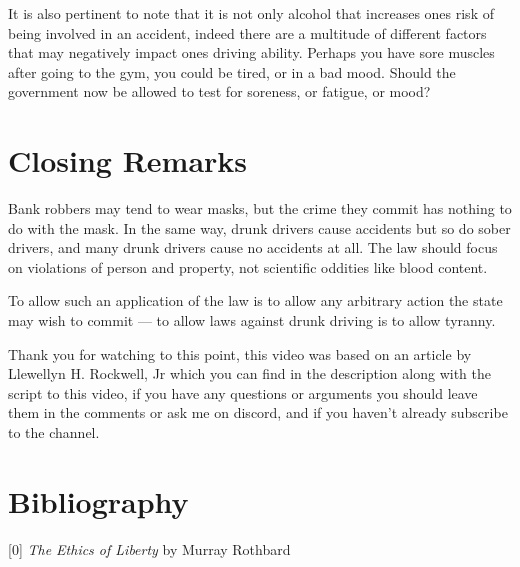 \documentclass[11pt]{article}
\begin{document}
It is also pertinent to note that it is not only alcohol that increases ones risk of being involved in an accident, indeed there are a multitude of different factors that may negatively impact ones driving ability. Perhaps you have sore muscles after going to the gym, you could be tired, or in a bad mood. Should the government now be allowed to test for soreness, or fatigue, or mood?


\section{Closing Remarks}
\label{sec:orgb110cdf}

Bank robbers may tend to wear masks, but the crime they commit has nothing to do with the mask. In the same way, drunk drivers cause accidents but so do sober drivers, and many drunk drivers cause no accidents at all. The law should focus on violations of person and property, not scientific oddities like blood content.

To allow such an application of the law is to allow any arbitrary action the state may wish to commit --- to allow laws against drunk driving is to allow tyranny.


Thank you for watching to this point, this video was based on an article by Llewellyn H. Rockwell, Jr which you can find in the description along with the script to this video, if you have any questions or arguments you should leave them in the comments or ask me on discord, and if you haven't already subscribe to the channel.



\section{Bibliography}
\label{sec:org013f1f1}

[0] \emph{The Ethics of Liberty} by Murray Rothbard
\end{document}
